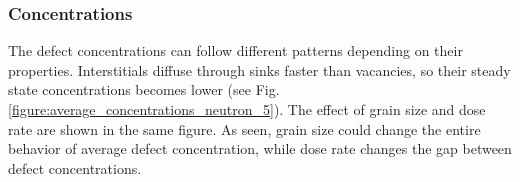 \documentclass[a4paper]{article}
\begin{document}
  \subsubsection{Concentrations} \hspace{10pt}
  The defect concentrations can follow different patterns depending on their properties. Interstitials diffuse through sinks faster than vacancies, so their steady state concentrations becomes lower (see Fig. \ref{figure:average_concentrations_neutron_5}). The effect of grain size and dose rate are shown in the same figure. As seen, grain size could change the entire behavior of average defect concentration, while dose rate changes the gap between defect concentrations.

    \begin{figure}[h!]  %
      \centering
      \qquad

\end{figure}
\end{document}
